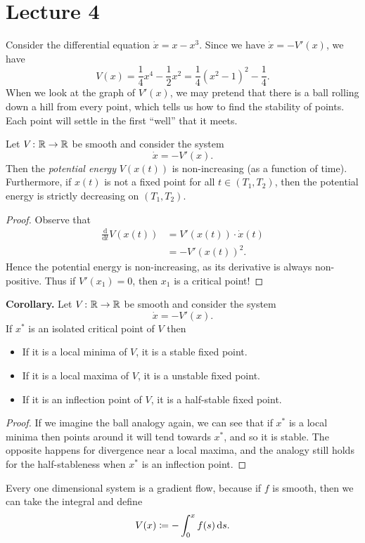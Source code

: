 \documentclass[class=article, crop=false]{standalone}
\begin{document}
  \section{Lecture 4}
  \begin{example}{}
    Consider the differential equation $\dot{x} = x - x^3$. Since we have $\dot{x} = -V'(x)$, we have
    \[
      V(x) = \frac{1}{4}x^4 - \frac{1}{2}x^2 = \frac{1}{4}(x^2 - 1)^2 - \frac{1}{4}.
    \]
    When we look at the graph of $V'(x)$, we may pretend that there is a ball rolling down a hill from every point, which tells us how to find the stability of points. Each point will settle in the first ``well'' that it meets.
  \end{example}
  \begin{theorem}{}
    Let $V\colon \mathbb{R}\to \mathbb{R}$ be smooth and consider the system
    \[
      \dot{x} = -V'(x).
    \]
    Then the \emph{potential energy} $V(x(t))$ is non-increasing (as a function of time). Furthermore, if $x(t)$ is not a fixed point for all $t\in (T_1, T_2)$, then the potential energy is strictly decreasing on $(T_1, T_2)$.
    \begin{proof}
      Observe that
      \begin{align*}
        \frac{\mathrm{d}}{\mathrm{d}t} V(x(t)) &= V'(x(t))\cdot \dot{x}(t) \\
                                               &= -V'(x(t))^2.
      \end{align*}
      Hence the potential energy is non-increasing, as its derivative is always non-positive. Thus if $V'(x_1) = 0$, then $x_1$ is a critical point!
    \end{proof}
  \end{theorem}
  \textbf{Corollary.} Let $V\colon \mathbb{R}\to \mathbb{R}$ be smooth and consider the system
  \[
    \dot{x} = -V'(x).
  \]
  If $x^*$ is an isolated critical point of $V$ then
  \begin{itemize}
    \item If it is a local minima of $V$, it is a stable fixed point.
    \item If it is a local maxima of $V$, it is a unstable fixed point.
    \item If it is an inflection point of $V$, it is a half-stable fixed point.
  \end{itemize}
  \begin{proof}
    If we imagine the ball analogy again, we can see that if $x^*$ is a local minima then points around it will tend towards $x^*$, and so it is stable. The opposite happens for divergence near a local maxima, and the analogy still holds for the half-stableness when $x^*$ is an inflection point.
  \end{proof}
  \begin{note}{}
    Every one dimensional system is a gradient flow, because if $f$ is smooth, then we can take the integral and define
    \[
      V(x)\coloneqq -\int_{0}^{x}f(s) \,\mathrm ds.
    \]
  \end{note}
\end{document}
